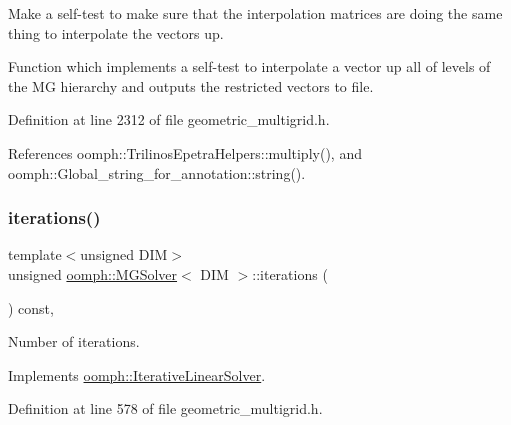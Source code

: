 Make a self-\/test to make sure that the interpolation matrices are doing the same thing to interpolate the vectors up. 

Function which implements a self-\/test to interpolate a vector up all of levels of the MG hierarchy and outputs the restricted vectors to file. 

Definition at line 2312 of file geometric\+\_\+multigrid.\+h.



References oomph\+::\+Trilinos\+Epetra\+Helpers\+::multiply(), and oomph\+::\+Global\+\_\+string\+\_\+for\+\_\+annotation\+::string().

\mbox{\label{classoomph_1_1MGSolver_ace1b91d44c67c990259807ee746a6363}} 
\subsubsection{\texorpdfstring{iterations()}{iterations()}}
{\footnotesize\ttfamily template$<$unsigned D\+IM$>$ \\
unsigned \hyperlink{classoomph_1_1MGSolver}{oomph\+::\+M\+G\+Solver}$<$ D\+IM $>$\+::iterations (\begin{DoxyParamCaption}{ }\end{DoxyParamCaption}) const\hspace{0.3cm}{\ttfamily [inline]}, {\ttfamily [virtual]}}



Number of iterations. 



Implements \hyperlink{classoomph_1_1IterativeLinearSolver_a5fe7f7b5e4847fdbd4f95d3875ec7a46}{oomph\+::\+Iterative\+Linear\+Solver}.



Definition at line 578 of file geometric\+\_\+multigrid.\+h.

\mbox{\label{classoomph_1_1MGSolver_afff71f3ed398a96105afb1e543085a80}} 
